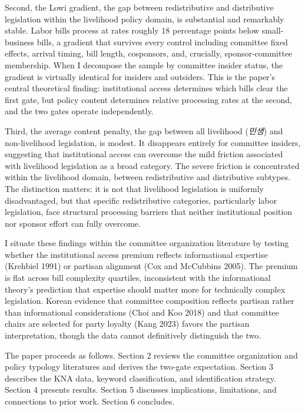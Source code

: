 \documentclass[11pt]{article}
\begin{document}
Second, the Lowi gradient, the gap between redistributive and distributive legislation within the livelihood policy domain, is substantial and remarkably stable. Labor bills process at rates roughly 18 percentage points below small-business bills, a gradient that survives every control including committee fixed effects, arrival timing, bill length, cosponsors, and, crucially, sponsor-committee membership. When I decompose the sample by committee insider status, the gradient is virtually identical for insiders and outsiders. This is the paper's central theoretical finding: institutional access determines which bills clear the first gate, but policy content determines relative processing rates at the second, and the two gates operate independently.

Third, the average content penalty, the gap between all livelihood (\emph{민생}) and non-livelihood legislation, is modest. It disappears entirely for committee insiders, suggesting that institutional access can overcome the mild friction associated with livelihood legislation as a broad category. The severe friction is concentrated within the livelihood domain, between redistributive and distributive subtypes. The distinction matters: it is not that livelihood legislation is uniformly disadvantaged, but that specific redistributive categories, particularly labor legislation, face structural processing barriers that neither institutional position nor sponsor effort can fully overcome.

I situate these findings within the committee organization literature by testing whether the institutional access premium reflects informational expertise (Krehbiel 1991) or partisan alignment (Cox and McCubbins 2005). The premium is flat across bill complexity quartiles, inconsistent with the informational theory's prediction that expertise should matter more for technically complex legislation. Korean evidence that committee composition reflects partisan rather than informational considerations (Choi and Koo 2018) and that committee chairs are selected for party loyalty (Kang 2023) favors the partisan interpretation, though the data cannot definitively distinguish the two.

The paper proceeds as follows. Section 2 reviews the committee organization and policy typology literatures and derives the two-gate expectation. Section 3 describes the KNA data, keyword classification, and identification strategy. Section 4 presents results. Section 5 discusses implications, limitations, and connections to prior work. Section 6 concludes.
\end{document}
